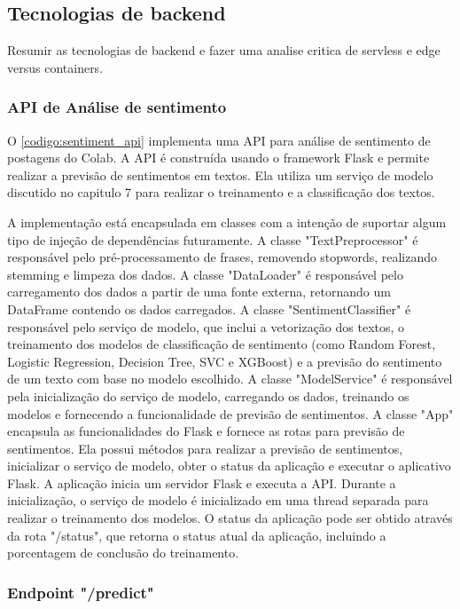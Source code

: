 \subsection{Tecnologias de backend}
Resumir as tecnologias de backend e fazer uma analise critica de servless e edge versus containers.
\lipsum[5]

\subsubsection{API de Análise de sentimento}

O \autoref{codigo:sentiment_api} implementa uma API para análise de sentimento de postagens do Colab. A API é construída usando o framework Flask e permite realizar a previsão de sentimentos em textos. Ela utiliza um serviço de modelo discutido no capitulo 7 para realizar o treinamento e a classificação dos textos.

A implementação está encapsulada em classes com a intenção de suportar algum tipo de injeção de dependências futuramente. A classe "TextPreprocessor" é responsável pelo pré-processamento de frases, removendo stopwords, realizando stemming e limpeza dos dados. A classe "DataLoader" é responsável pelo carregamento dos dados a partir de uma fonte externa, retornando um DataFrame contendo os dados carregados. A classe "SentimentClassifier" é responsável pelo serviço de modelo, que inclui a vetorização dos textos, o treinamento dos modelos de classificação de sentimento (como Random Forest, Logistic Regression, Decision Tree, SVC e XGBoost) e a previsão do sentimento de um texto com base no modelo escolhido. A classe "ModelService" é responsável pela inicialização do serviço de modelo, carregando os dados, treinando os modelos e fornecendo a funcionalidade de previsão de sentimentos. A classe "App" encapsula as funcionalidades do Flask e fornece as rotas para previsão de sentimentos. Ela possui métodos para realizar a previsão de sentimentos, inicializar o serviço de modelo, obter o status da aplicação e executar o aplicativo Flask. A aplicação inicia um servidor Flask e executa a API. Durante a inicialização, o serviço de modelo é inicializado em uma thread separada para realizar o treinamento dos modelos. O status da aplicação pode ser obtido através da rota "/status", que retorna o status atual da aplicação, incluindo a porcentagem de conclusão do treinamento.

\subsubsection*{Endpoint "/predict"}


